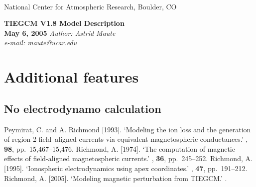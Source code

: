 \documentclass[]{article}
\begin{document}
%
\begin{titlepage}
%
\begin{latexonly}
 \\
\noindent National Center for Atmospheric Research, Boulder, CO \\
\vspace{2in}
\end{latexonly}
%
\begin{center}
{\Large\bf TIEGCM V1.8 Model Description} \\
{\bf May 6, 2005}
\medskip
{\it Author: Astrid Maute} \\
{\it e-mail: maute@ucar.edu}
\end{center}
%
\end{titlepage}
\setcounter{page}{1}
%

%
\tableofcontents
%

%
%
%
%
\newpage
%

%

%

%

%

%

%

%

%

%

%
\section{Additional features}
%

\subsection{No electrodynamo calculation}
%
\begin{thebibliography}{1}
\newcommand{\enquote}[1]{`#1'}
%
{\sc Peymirat, C. and A. Richmond} [1993].
\newblock \enquote{Modeling the ion loss and the generation of region 2 field--aligned
currents via equivalent magnetospheric conductances.}
, {\bf 98}, pp.~15,467--15,476.
%
{\sc Richmond, A.} [1974].
\newblock \enquote{The computation of magnetic effects of field-aligned
  magnetospheric currents.}
, {\bf 36}, pp.~245--252.
%
{\sc Richmond, A.} [1995].
\newblock \enquote{Ionospheric electrodynamics using apex coordinates.}
, {\bf 47}, pp.~191--212.
%
{\sc Richmond, A.} [2005].
\newblock \enquote{Modeling magnetic perturbation from TIEGCM.}
.
%
\end{thebibliography}
%
\end{document}
